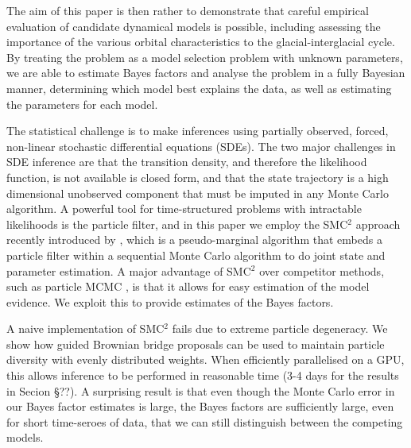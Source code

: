 \documentclass[a4paper,12pt]{article}
\begin{document}
The aim of this paper is then rather to demonstrate that careful  empirical evaluation of  candidate dynamical models is possible, including assessing the importance of the various orbital characteristics to the glacial-interglacial cycle.
By treating the problem as a model selection problem with unknown parameters, we are able to estimate Bayes factors and analyse the problem in a fully Bayesian manner,  determining which model best explains the  data, as well as estimating the  parameters for each model.

The statistical challenge
 is to make 
inferences using partially observed, forced,
non-linear stochastic differential equations (SDEs). The two major challenges in SDE inference are  that the transition density, and therefore the likelihood function, is not
available is closed form, and that the state trajectory is a high dimensional unobserved component that must be imputed in any Monte Carlo algorithm.
 A powerful tool for time-structured problems with intractable likelihoods is the particle
filter, and in this paper we employ the  SMC$^2$ approach recently
introduced by \cite{Chopin2012}, which is a pseudo-marginal algorithm that embeds a particle filter within a sequential Monte Carlo algorithm to do joint state and parameter estimation. A major advantage of SMC$^2$ over  competitor methods, such as particle MCMC \cite{Andrieu2010}, is that it allows for easy estimation of the model evidence. We exploit this to provide estimates of the Bayes factors. 

A naive implementation of SMC$^2$ fails due to extreme particle degeneracy. We show how guided Brownian bridge proposals can be used to maintain particle diversity with evenly distributed weights. When efficiently parallelised on a GPU, this allows inference to be performed in reasonable time (3-4 days for the results in Secion \S??). A surprising result is that even though the Monte Carlo error in our Bayes factor estimates is large, the Bayes factors are sufficiently large, even for short time-seroes of data, that we can still distinguish between the competing models.
\end{document}
